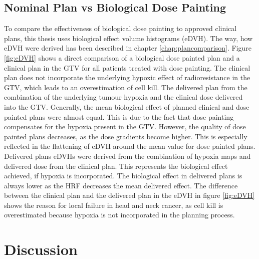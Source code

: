 \subsection{Nominal Plan vs Biological Dose Painting}
To compare the effectiveness of biological dose painting to approved clinical plans, this thesis uses biological effect volume histograms (eDVH). The way, how eDVH were derived has been described in chapter \ref{chap:plancomparison}. Figure \ref{fig:eDVH} shows a direct comparison of a biological dose painted plan and a clinical plan in the GTV for all patients treated with dose painting. The clinical plan does not incorporate the underlying hypoxic effect of radioresistance in the GTV, which leads to an overestimation of cell kill. The delivered plan from the combination of the underlying tumour hypoxia and the clinical dose delivered into the GTV. Generally, the mean biological effect of planned clinical and dose painted plans were almost equal. This is due to the fact that dose painting compensates for the hypoxia present in the GTV. However, the quality of dose painted plans decreases, as the dose gradients become higher. This is especially reflected in the flattening of eDVH around the mean value for dose painted plans. Delivered plans eDVHs were derived from the combination of hypoxia maps and delivered dose from the clinical plan. This represents the biological effect achieved, if hypoxia is incorporated. The biological effect in delivered plans is always lower as the HRF decreases the mean delivered effect. The difference between the clinical plan and the delivered plan in the eDVH in figure \ref{fig:eDVH} shows the reason for local failure in head and neck cancer, as cell kill is overestimated because hypoxia is not incorporated in the planning process.
\begin{sidewaysfigure}[p]
\centering
{}
\caption{eDVH of GTV for all treated patients with biological dose painting. The biological effect of the delivered plan (blue) reduced through hypoxia is based on the clinical plan (green). Dose painting (red) is able to compensate for hypoxia by increasing the dose to such volumes. The dip in the eDVH for the delivered plan (blue) stems from the 2.5 mmHg hypoxia level.}
\label{fig:eDVH}
\end{sidewaysfigure}
\section{Discussion}
